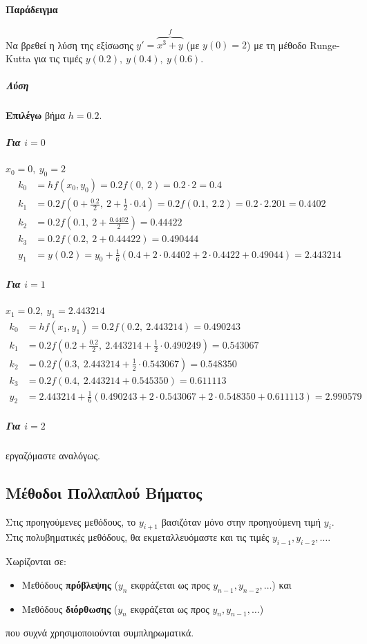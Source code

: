 \documentclass[11pt,a4paper,notitlepage,fleqn,final]{article}
\begin{document}
\paragraph{Παράδειγμα}
Να βρεθεί η λύση της εξίσωσης \( y' = \overbrace{x^3+y}^f \)
(με \( y(0)=2 \))
με τη μέθοδο Runge-Kutta για τις τιμές \( y(0.2),\ y(0.4),\ y(0.6) \).
\subparagraph{Λύση}
\textbf{Επιλέγω} βήμα \( h=0.2 \).
\subparagraph{Για \( i=0 \)} \( x_0=0,\ y_0=2 \)
\begin{align*}
	k_0 &= hf(x_0,y_0) =
	0.2f(0,\ 2)=0.2\cdot 2 = 0.4 \\
	k_1 &= 0.2f\left(
	0+\frac{0.2}{2},\ 2+\frac{1}{2}\cdot 0.4
	\right) = 0.2f(0.1,\ 2.2) = 0.2 \cdot 2.201 = 0.4402 \\
	k_2 &= 0.2f(0.1,\ 2+\frac{0.4402}{2}) = 0.44422 \\
	k_3 &= 0.2f(0.2,\ 2+0.44422) = 0.490444 \\
	y_1 &= y(0.2) = y_0+\frac{1}{6}(
	0.4+2\cdot 0.4402+2\cdot 0.4422 + 0.49044
	) = 2.443214
\end{align*}
\subparagraph{Για \( i=1 \)} \( x_1=0.2,\ y_1=2.443214 \)
\begin{align*}
	k_0 &= hf(x_1,y_1) = 0.2f(0.2,\ 2.443214) =
	0.490243 \\
	k_1 &= 0.2f\left( 0.2+\frac{0.2}{2},\ 2.443214+\frac{1}{2}
	\cdot 0.490249 \right) = 0.543067 \\
	k_2 &= 0.2f(0.3,\ 2.443214+\frac{1}{2}\cdot 0.543067)
	= 0.548350 \\
	k_3 &= 0.2f(0.4,\ 2.443214+0.545350) = 0.611113 \\
	y_2 &= 2.443214+\frac{1}{6}(0.490243+2\cdot 0.543067
	+2\cdot 0.548350+0.611113)
	= 2.990579
\end{align*}
\subparagraph{Για \( i = 2\)} εργαζόμαστε αναλόγως.

\subsection{Μέθοδοι Πολλαπλού Βήματος}
Στις προηγούμενες μεθόδους, το \( y_{i+1} \) βασιζόταν μόνο στην
προηγούμενη τιμή \( y_i \). Στις πολυβηματικές μεθόδους, θα
εκμεταλλευόμαστε και τις τιμές \( y_{i-1},y_{i-2},\dots \).

Χωρίζονται σε:
\begin{itemize}
	\item Μεθόδους \textbf{πρόβλεψης}
	(\( y_n \) εκφράζεται ως προς \( y_{n-1},y_{n-2},\dots \)) και
	\item Μεθόδους \textbf{διόρθωσης}
	(\( y_n \) εκφράζεται ως προς \( y_n,y_{n-1},\dots \))
\end{itemize}
που συχνά χρησιμοποιούνται συμπληρωματικά.
\end{document}
